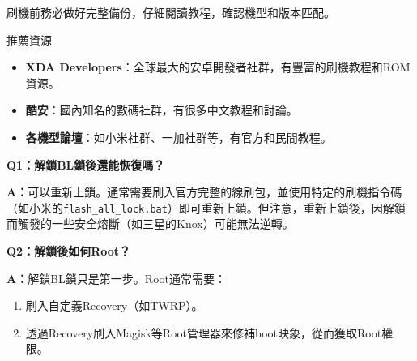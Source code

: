 刷機前務必做好完整備份，仔細閱讀教程，確認機型和版本匹配。

\begin{tcbinfo}{推薦資源}
\begin{itemize}
  \item \textbf{XDA Developers}：全球最大的安卓開發者社群，有豐富的刷機教程和ROM資源。
  \item \textbf{酷安}：國內知名的數碼社群，有很多中文教程和討論。
  \item \textbf{各機型論壇}：如小米社群、一加社群等，有官方和民間教程。
\end{itemize}

\end{tcbinfo}


\textbf{Q1：解鎖BL鎖後還能恢復嗎？}\par

\textbf{A：}可以重新上鎖。通常需要刷入官方完整的線刷包，並使用特定的刷機指令碼（如小米的\texttt{flash\_all\_lock.\allowbreak bat}）即可重新上鎖。但注意，重新上鎖後，因解鎖而觸發的一些安全熔斷（如三星的Knox）可能無法逆轉。

\textbf{Q2：解鎖後如何Root？}\par

\textbf{A：}解鎖BL鎖只是第一步。Root通常需要：

\begin{enumerate}
  \item 刷入自定義Recovery（如TWRP）。
  \item 透過Recovery刷入Magisk等Root管理器來修補boot映象，從而獲取Root權限。
\end{enumerate}
